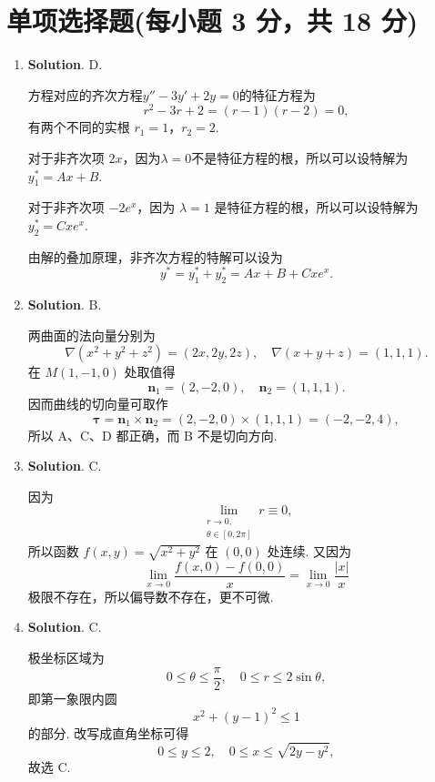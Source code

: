 \documentclass[../main.tex]{subfiles}
\begin{document}
\section{单项选择题(每小题 3 分，共 18 分)}
\begin{enumerate}
    \item \textbf{Solution}. D.

          方程对应的齐次方程$y''-3y'+2y=0$的特征方程为
          \[
              r^2-3r+2=(r-1)(r-2)=0,
          \]
          有两个不同的实根 \(r_1=1\)，\(r_2=2\).

          对于非齐次项 \(2x\)，因为$\lambda=0$不是特征方程的根，所以可以设特解为 \(y_1^* = Ax + B\).

          对于非齐次项 \(-2e^x\)，因为 \(\lambda=1\) 是特征方程的根，所以可以设特解为 \(y_2^* = Cxe^x\).

          由解的叠加原理，非齐次方程的特解可以设为
          \[
              y^* = y_1^* + y_2^* = Ax + B + Cxe^x.
          \]

    \item \textbf{Solution}. B.

          两曲面的法向量分别为
          \[
              \nabla(x^2+y^2+z^2)=(2x,2y,2z),\quad \nabla(x+y+z)=(1,1,1).
          \]
          在 \(M(1,-1,0)\) 处取值得
          \[
              \boldsymbol{n}_1=(2,-2,0),\quad \boldsymbol{n}_2=(1,1,1).
          \]
          因而曲线的切向量可取作
          \[
              \boldsymbol{\tau} = \boldsymbol{n}_1\times\boldsymbol{n}_2 = (2,-2,0)\times(1,1,1)=(-2,-2,4),
          \]
          所以 A、C、D 都正确，而 B 不是切向方向.

    \item \textbf{Solution}. C.

          因为
          \[
              \lim_{\substack{r\to0,\\\theta\in[0,2\pi]}}r\equiv0,
          \]
          所以函数 \(f(x,y)=\sqrt{x^2+y^2}\) 在 \((0,0)\) 处连续. 又因为
          \[
              \lim_{x\to0}\frac{f(x,0)-f(0,0)}{x}=\lim_{x\to0}\frac{|x|}{x}
          \]
          极限不存在，所以偏导数不存在，更不可微.

    \item \textbf{Solution}. C.

          极坐标区域为
          \[
              0\le \theta\le \frac{\pi}{2},\quad 0\le r\le 2\sin\theta,
          \]
          即第一象限内圆
          \[
              x^2+(y-1)^2\le 1
          \]
          的部分. 改写成直角坐标可得
          \[
              0\le y\le 2,\quad 0\le x\le \sqrt{2y-y^2},
          \]
          故选 C.


\end{enumerate}
\end{document}
